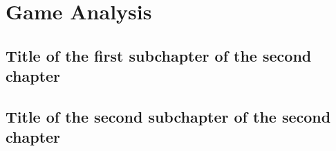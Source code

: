 \chapter{Game Analysis}

\section{Title of the first subchapter of the second chapter}

\section{Title of the second subchapter of the second chapter}
